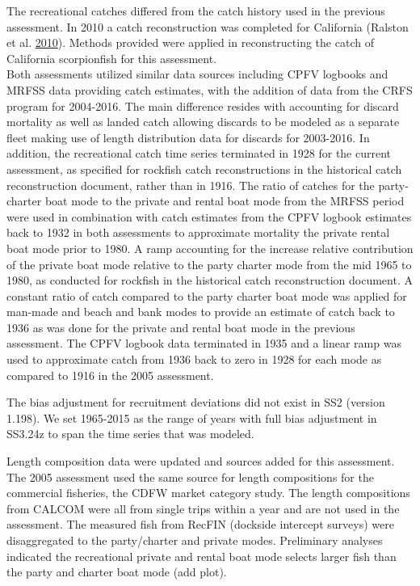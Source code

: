 \documentclass[12pt,]{article}
\begin{document}
The recreational catches differed from the catch history used in the
previous assessment. In 2010 a catch reconstruction was completed for
California (Ralston et al. \protect\hyperlink{ref-Ralston2010}{2010}).
Methods provided were applied in reconstructing the catch of California
scorpionfish for this assessment.\\
Both assessments utilized similar data sources including CPFV logbooks
and MRFSS data providing catch estimates, with the addition of data from
the CRFS program for 2004-2016. The main difference resides with
accounting for discard mortality as well as landed catch allowing
discards to be modeled as a separate fleet making use of length
distribution data for discards for 2003-2016. In addition, the
recreational catch time series terminated in 1928 for the current
assessment, as specified for rockfish catch reconstructions in the
historical catch reconstruction document, rather than in 1916. The ratio
of catches for the party-charter boat mode to the private and rental
boat mode from the MRFSS period were used in combination with catch
estimates from the CPFV logbook estimates back to 1932 in both
assessments to approximate mortality the private rental boat mode prior
to 1980. A ramp accounting for the increase relative contribution of the
private boat mode relative to the party charter mode from the mid 1965
to 1980, as conducted for rockfish in the historical catch
reconstruction document. A constant ratio of catch compared to the party
charter boat mode was applied for man-made and beach and bank modes to
provide an estimate of catch back to 1936 as was done for the private
and rental boat mode in the previous assessment. The CPFV logbook data
terminated in 1935 and a linear ramp was used to approximate catch from
1936 back to zero in 1928 for each mode as compared to 1916 in the 2005
assessment.

The bias adjustment for recruitment deviations did not exist in SS2
(version 1.198). We set 1965-2015 as the range of years with full bias
adjustment in SS3.24z to span the time series that was modeled.

Length composition data were updated and sources added for this
assessment. The 2005 assessment used the same source for length
compositions for the commercial fisheries, the CDFW market category
study. The length compositions from CALCOM were all from single trips
within a year and are not used in the assessment. The measured fish from
RecFIN (dockside intercept surveys) were disaggregated to the
party/charter and private modes. Preliminary analyses indicated the
recreational private and rental boat mode selects larger fish than the
party and charter boat mode (add plot).
\end{document}
